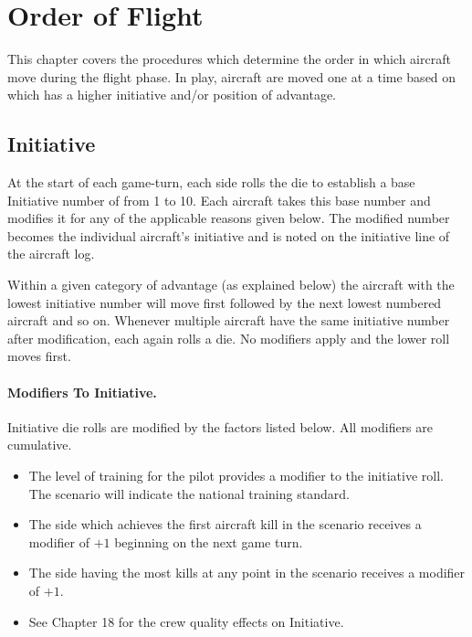 \section{Order of Flight}

This chapter covers the procedures which determine the order in which aircraft move during the flight phase. In play, aircraft are moved one at a time based on which has a higher initiative and/or position of advantage.

\subsection{Initiative}

At the start of each game-turn, each side rolls the die to establish a base Initiative number of from 1 to 10. Each aircraft takes this base number and modifies it for any of the applicable reasons given below. The modified number becomes the individual aircraft's initiative and is noted on the initiative line of the aircraft log.

Within a given category of advantage (as explained below) the aircraft with the lowest initiative number will move first followed by the next lowest numbered aircraft and so on. Whenever multiple aircraft have the same initiative number after modification, each again rolls a die. No modifiers apply and the lower roll moves first.

\paragraph{Modifiers To Initiative.} Initiative die rolls are modified by the factors listed below. All modifiers are cumulative.

\begin{itemize}

    \item{} The level of training for the pilot provides a modifier to the initiative roll. The scenario will indicate the national training standard.

    \item{} The side which achieves the first aircraft kill in the scenario receives a modifier of $+1$ beginning on the next game turn.

    \item{} The side having the most kills at any point in the scenario receives a modifier of $+1$.

    \item{} See Chapter 18 for the crew quality effects on Initiative.
\end{itemize}

